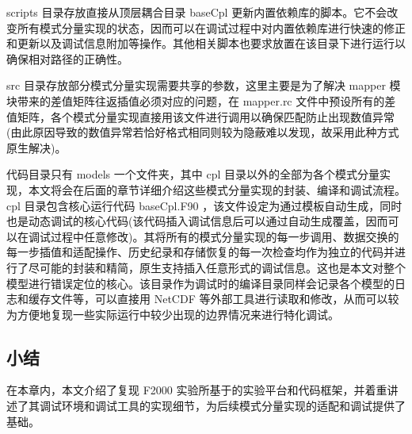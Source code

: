 scripts 目录存放直接从顶层耦合目录 baseCpl 更新内置依赖库的脚本。它不会改变所有模式分量实现的状态，因而可以在调试过程中对内置依赖库进行快速的修正和更新以及调试信息附加等操作。其他相关脚本也要求放置在该目录下进行运行以确保相对路径的正确性。

src 目录存放部分模式分量实现需要共享的参数，这里主要是为了解决 mapper 模块带来的差值矩阵往返插值必须对应的问题，在 mapper.rc 文件中预设所有的差值矩阵，各个模式分量实现直接用该文件进行调用以确保匹配防止出现数值异常(由此原因导致的数值异常若恰好格式相同则较为隐蔽难以发现，故采用此种方式原生解决)。

代码目录只有 models 一个文件夹，其中 cpl 目录以外的全部为各个模式分量实现，本文将会在后面的章节详细介绍这些模式分量实现的封装、编译和调试流程。 cpl 目录包含核心运行代码 baseCpl.F90 ，该文件设定为通过模板自动生成，同时也是动态调试的核心代码(该代码插入调试信息后可以通过自动生成覆盖，因而可以在调试过程中任意修改)。其将所有的模式分量实现的每一步调用、数据交换的每一步插值和适配操作、历史纪录和存储恢复的每一次检查均作为独立的代码并进行了尽可能的封装和精简，原生支持插入任意形式的调试信息。这也是本文对整个模型进行错误定位的核心。该目录作为调试时的编译目录同样会记录各个模型的日志和缓存文件等，可以直接用 NetCDF 等外部工具进行读取和修改，从而可以较为方便地复现一些实际运行中较少出现的边界情况来进行特化调试。

\subsection{小结}

在本章内，本文介绍了复现 F2000 实验所基于的实验平台和代码框架，并着重讲述了其调试环境和调试工具的实现细节，为后续模式分量实现的适配和调试提供了基础。
